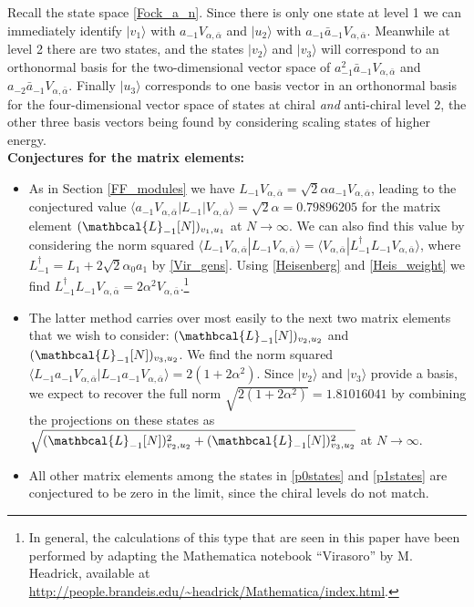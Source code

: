 \documentclass[a4paper,10pt]{article}
\newcommand{\LnMat}[1]{\mathbcal{L}_{#1}}
\begin{document}
Recall the state space \eqref{Fock_a_n}. Since there is only one state at level 1 we can immediately identify $|v_1 \rangle$ with $a_{-1} V_{\alpha,\bar{\alpha}}$ and $| u_2 \rangle$ with $a_{-1}\bar{a}_{-1}V_{\alpha,\bar{\alpha}}$. Meanwhile at level 2 there are two states, and the states $|v_2\rangle$ and $|v_3\rangle$ will correspond to an orthonormal basis for the two-dimensional vector space of $a_{-1}^2 \bar{a}_{-1} V_{\alpha,\bar{\alpha}}$ and $a_{-2} \bar{a}_{-1} V_{\alpha,\bar{\alpha}}$. Finally $|u_3\rangle$ corresponds to one basis vector in an orthonormal basis for the four-dimensional vector space of states at chiral \emph{and} anti-chiral level 2, the other three basis vectors being found by considering scaling states of higher energy.
~\\

\textbf{Conjectures for the matrix elements:}
\begin{itemize}



\item As in Section \ref{FF_modules} we have $L_{-1} V_{\alpha,\bar{\alpha}}  = \sqrt{2} \alpha a_{-1} V_{\alpha,\bar{\alpha}}  $, leading to the conjectured value $\langle a_{-1}V_{\alpha,\bar{\alpha}}   |L_{-1}|V_{\alpha,\bar{\alpha}} \rangle=\sqrt{2}\alpha=0.79896205$ for the matrix element $(\LnMat{-1}[N])_{v_1,u_1}$ at $N\rightarrow \infty$.  We can also find this value by considering the norm squared $\langle L_{-1} V_{\alpha,\bar{\alpha}} | L_{-1} V_{\alpha,\bar{\alpha}} \rangle = \langle  V_{\alpha,\bar{\alpha}} | L_{-1}^\dagger L_{-1} V_{\alpha,\bar{\alpha}} \rangle$,  where $L_{-1}^\dagger = L_{1} + 2\sqrt{2}\alpha_0 a_1 $ by \eqref{Vir_gens}.   Using \eqref{Heisenberg} and \eqref{Heis_weight} we find $L_{-1}^\dagger L_{-1} V_{\alpha,\bar{\alpha}}  = 2\alpha^2 V_{\alpha,\bar{\alpha}} $.\footnote{In general, the calculations of this type that are seen in this paper have been performed by adapting the Mathematica notebook ``Virasoro'' by M. Headrick, available at  \url{http://people.brandeis.edu/~headrick/Mathematica/index.html}.} 

\item The latter method carries over most easily to the next two matrix elements that we wish to consider: $(\LnMat{-1}[N])_{v_2,u_2}$ and 
$(\LnMat{-1}[N])_{v_3,u_2}$. We find the norm squared $\langle L_{-1}a_{-1}V_{\alpha,\bar{\alpha}}  | L_{-1}a_{-1}V_{\alpha,\bar{\alpha}} \rangle= 2(1+2\alpha^2)$. Since $|v_2\rangle$ and $|v_3\rangle$ provide a basis, we expect to recover the full norm $\sqrt{2(1+2\alpha^2)}  =1.81016041$ by combining the projections on these states as $\sqrt{ (\LnMat{-1}[N])^2_{v_2,u_2} + (\LnMat{-1}[N])_{v_3,u_2}^2 }$ at $N \rightarrow \infty$. 



\item All other matrix elements among the states in \eqref{p0states} and \eqref{p1states} are conjectured to be zero in the limit, since the chiral levels do not match.

\end{itemize}
\end{document}
